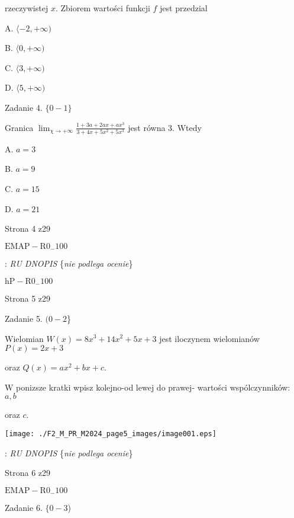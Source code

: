 \documentclass[a4paper,12pt]{article}
\begin{document}
rzeczywistej $x$. Zbiorem wartości funkcji $f$ jest przedzial

A. $\langle-2, +\infty)$

B. $\langle 0, +\infty)$

C. $\langle 3, +\infty)$

D. $\langle 5, +\infty)$

Zadanie 4. $\{0-1\}$

Granica $\displaystyle \lim_{\chi\rightarrow+\infty}\frac{1+3a+2ax+ax^{3}}{3+4x+5x^{2}+5x^{3}}$ jest równa 3. Wtedy

A. $a=3$

B. $a=9$

C. $a=15$

D. $a=21$

Strona 4 z29

$\mathrm{E}\mathrm{M}\mathrm{A}\mathrm{P}-\mathrm{R}0_{-}100$















: {\it RU DNOPIS} \{{\it nie podlega ocenie}\}

$\mathrm{h}\mathrm{P}-\mathrm{R}0_{-}100$

Strona 5 z29





Zadanie 5. $(0-2$\}

Wielomian $W(x)=8x^{3}+14x^{2}+5x+3$ jest iloczynem wielomianów $P(x)=2x+3$

oraz $Q(x)=ax^{2}+bx+c.$

$\mathrm{W}$ ponizsze kratki wpisz kolejno-od lewej do prawej- wartości wspólczynników: $a, b$

oraz $c.$
\begin{center}
\texttt{[image: ./F2\_M\_PR\_M2024\_page5\_images/image001.eps]}
\end{center}
: {\it RU DNOPIS} \{{\it nie podlega ocenie}\}

Strona 6 z29

$\mathrm{E}\mathrm{M}\mathrm{A}\mathrm{P}-\mathrm{R}0_{-}100$





Zadanie 6. $\{0-3$)
\end{document}
